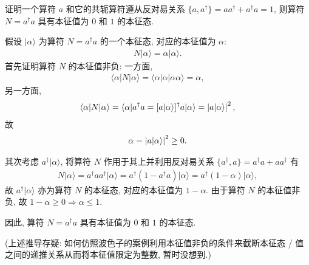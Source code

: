 \documentclass{assignment}
\begin{document}
\begin{prob}[课本习题 7.7]
    证明一个算符 $a$ 和它的共轭算符遵从反对易关系 $\{a,a^{\dagger}\}=aa^{\dagger}+a^{\dagger}a=1$, 则算符 $N=a^{\dagger}a$ 具有本征值为 $0$ 和 $1$ 的本征态.
\end{prob}
\begin{pf}
    假设 $\lvert\alpha\rangle$ 为算符 $N=a^{\dagger}a$ 的一个本征态, 对应的本征值为 $\alpha$:
    \begin{align}
        N\lvert\alpha\rangle=\alpha\lvert\alpha\rangle.
    \end{align}
    首先证明算符 $N$ 的本征值非负: 一方面,
    \begin{align}
        \langle\alpha\rvert N\lvert\alpha\rangle=\langle\alpha\rvert\alpha\lvert\alpha\alpha\rangle=\alpha,
    \end{align}
    另一方面,
    \begin{align}
        \langle\alpha\rvert N\lvert\alpha\rangle=\langle\alpha\rvert a^{\dagger}a=[a\lvert\alpha\rangle]^{\dagger}a\lvert\alpha\rangle=\left\lvert a\lvert\alpha\rangle\right\rvert^2,
    \end{align}
    故
    \begin{align}
        \alpha=\left\lvert a\lvert\alpha\rangle\right\rvert^2\geq 0.
    \end{align}

    其次考虑 $a^{\dagger}\lvert\alpha\rangle$, 将算符 $N$ 作用于其上并利用反对易关系 $\{a^{\dagger},a\}=a^{\dagger}a+aa^{\dagger}$ 有
    \begin{align}
        N\lvert\alpha\rangle=a^{\dagger}aa^{\dagger}\lvert\alpha\rangle=a^{\dagger}(1-a^{\dagger}a)\lvert\alpha\rangle=a^{\dagger}(1-\alpha)\lvert\alpha\rangle,
    \end{align}
    故 $a^{\dagger}\lvert\alpha\rangle$ 亦为算符 $N$ 的本征态, 对应的本征值为 $1-\alpha$. 由于算符 $N$ 的本征值非负, 故 $1-\alpha\geq 0\Longrightarrow\alpha\leq 1$.

    因此, 算符 $N=a^{\dagger}a$ 具有本征值为 $0$ 和 $1$ 的本征态.

    (上述推导存疑: 如何仿照波色子的案例利用本征值非负的条件来截断本征态 / 值之间的递推关系从而将本征值限定为整数, 暂时没想到.)
\end{pf}
\end{document}
